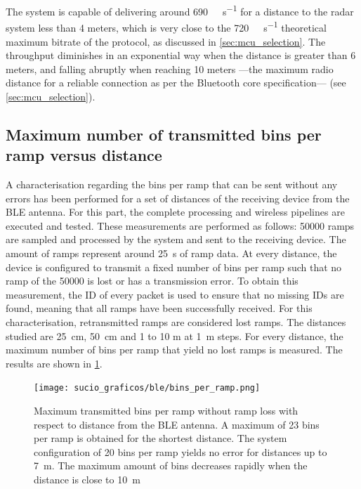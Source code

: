 The system is capable of delivering around \SI{690}{\kilo\bit\per\second} for a distance to the radar system less than 4 meters, which is very close to the \SI{720}{\kilo\bit\per\second} theoretical maximum bitrate of the protocol, as discussed in \cref{sec:mcu_selection}. The throughput diminishes in an exponential way when the distance is greater than 6 meters, and falling abruptly when reaching 10 meters ---the maximum radio distance for a reliable connection as per the Bluetooth core specification--- (see \cref{sec:mcu_selection}).

\subsection{Maximum number of transmitted bins per ramp versus distance} \label{sec:max_number_bins_vs_distance}

A characterisation regarding the bins per ramp that can be sent without any errors has been performed for a set of distances of the receiving device from the BLE antenna. For this part, the complete processing and wireless pipelines are executed and tested. These measurements are performed as follows: 50000 ramps are sampled and processed by the system and sent to the receiving device. The amount of ramps represent around \SI{25}{\second} of ramp data. At every distance, the device is configured to transmit a fixed number of bins per ramp such that no ramp of the 50000 is lost or has a transmission error. To obtain this measurement, the ID of every packet is used to ensure that no missing IDs are found, meaning that all ramps have been successfully received. For this characterisation, retransmitted ramps are considered lost ramps. The distances studied are \SI{25}{\centi\metre}, \SI{50}{\centi\metre} and 1 to 10 \si{\metre} at \SI{1}{\metre} steps. For every distance, the maximum number of bins per ramp that yield no lost ramps is measured. The results are shown in \cref{fig:firmware_ble_char_bins}.

\begin{figure}[ht]
	\centering
	\texttt{[image: sucio\_graficos/ble/bins\_per\_ramp.png]}
	\caption{Maximum transmitted bins per ramp without ramp loss with respect to distance from the BLE antenna. A maximum of 23 bins per ramp is obtained for the shortest distance. The system configuration of 20 bins per ramp yields no error for distances up to \SI{7}{\metre}. The maximum amount of bins decreases rapidly when the distance is close to \SI{10}{\metre}
	\label{fig:firmware_ble_char_bins}}
\end{figure}

